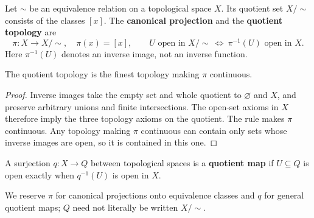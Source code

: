 \begin{definition}
Let $\sim$ be an equivalence relation on a topological space $X$.
Its quotient set $X/{\sim}$ consists of the classes $[x]$.
The \textbf{canonical projection} and the \textbf{quotient topology} are
\[
\pi:X\longrightarrow X/{\sim},\quad \pi(x)=[x],\qquad
U\text{ open in }X/{\sim}\ \Longleftrightarrow\ \pi^{-1}(U)\text{ open in }X.
\]
Here $\pi^{-1}(U)$ denotes an inverse image, not an inverse function.
\end{definition}
\begin{proposition}
The quotient topology is the finest topology making $\pi$ continuous.
\end{proposition}
\begin{proof}
Inverse images take the empty set and whole quotient to $\varnothing$ and
$X$, and preserve arbitrary unions and finite intersections. The open-set
axioms in $X$ therefore imply the three topology axioms on the quotient.
The rule makes $\pi$ continuous. Any topology making $\pi$ continuous can
contain only sets whose inverse images are open, so it is contained in this one.
\end{proof}
\begin{definition}
A surjection $q:X\to Q$ between topological spaces is a \textbf{quotient map}
if $U\subseteq Q$ is open exactly when $q^{-1}(U)$ is open in $X$.
\end{definition}
We reserve $\pi$ for canonical projections onto equivalence classes and
$q$ for general quotient maps; $Q$ need not literally be written $X/{\sim}$.

